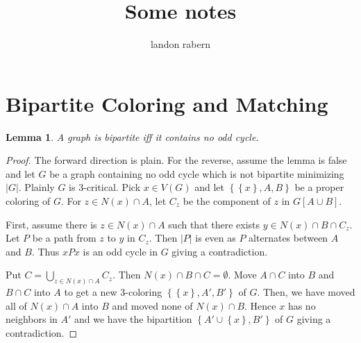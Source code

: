 \documentclass[12pt]{article}
\title{Some notes}
\author{landon rabern}
\theoremstyle{plain}
\newtheorem{lem}[thm]{Lemma}
\theoremstyle{definition}
\theoremstyle{remark}
\newcommand{\set}[1]{\left\{ #1 \right\}}
\newcommand{\card}[1]{\left|#1\right|}
\begin{document}
\maketitle
\section{Bipartite Coloring and Matching}

\begin{lem}
A graph is bipartite iff it contains no odd cycle.
\end{lem}
\begin{proof}
The forward direction is plain.  For the reverse, assume the lemma is false and let $G$ be a graph containing no odd cycle which is not bipartite minimizing $\card{G}$.  Plainly $G$ is $3$-critical.  Pick $x \in V(G)$ and let $\set{\set{x}, A, B}$ be a proper coloring of $G$.  For $z \in N(x) \cap A$, let $C_z$ be the component of $z$ in $G[A \cup B]$.  

First, assume there is $z \in N(x) \cap A$ such that there exists $y \in N(x) \cap B \cap C_z$.  Let $P$ be a path from $z$ to $y$ in $C_z$.  Then $\card{P}$ is even as $P$ alternates between $A$ and $B$. Thus $xPx$ is an odd cycle in $G$ giving a contradiction.

Put $C = \bigcup_{z \in N(x) \cap A} C_z$.  Then $N(x) \cap B \cap C = \emptyset$. Move $A \cap C$ into $B$ and $B \cap C$ into $A$ to get a new $3$-coloring $\set{\set{x}, A', B'}$ of $G$.  Then, we have moved all of $N(x) \cap A$ into $B$ and moved none of $N(x) \cap B$.  Hence $x$ has no neighbors in $A'$ and we have the bipartition $\set{A' \cup \set{x}, B'}$ of $G$ giving a contradiction.
\end{proof}
\end{document}
